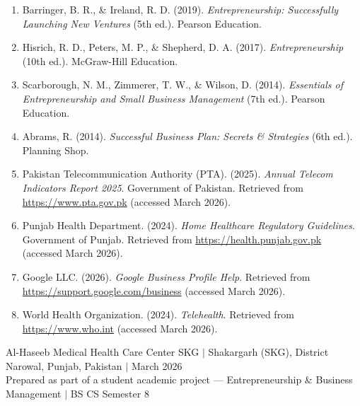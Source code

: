 \documentclass[12pt, a4paper]{article}
\begin{document}
\begin{enumerate}[leftmargin=1.6em]
    \item Barringer, B. R., \& Ireland, R. D. (2019). \textit{Entrepreneurship: Successfully Launching New Ventures} (5th ed.). Pearson Education.
    \item Hisrich, R. D., Peters, M. P., \& Shepherd, D. A. (2017). \textit{Entrepreneurship} (10th ed.). McGraw-Hill Education.
    \item Scarborough, N. M., Zimmerer, T. W., \& Wilson, D. (2014). \textit{Essentials of Entrepreneurship and Small Business Management} (7th ed.). Pearson Education.
    \item Abrams, R. (2014). \textit{Successful Business Plan: Secrets \& Strategies} (6th ed.). Planning Shop.
    \item Pakistan Telecommunication Authority (PTA). (2025). \textit{Annual Telecom Indicators Report 2025}. Government of Pakistan. Retrieved from \url{https://www.pta.gov.pk} (accessed March 2026).
    \item Punjab Health Department. (2024). \textit{Home Healthcare Regulatory Guidelines}. Government of Punjab. Retrieved from \url{https://health.punjab.gov.pk} (accessed March 2026).
    \item Google LLC. (2026). \textit{Google Business Profile Help}. Retrieved from \url{https://support.google.com/business} (accessed March 2026).
    \item World Health Organization. (2024). \textit{Telehealth}. Retrieved from \url{https://www.who.int} (accessed March 2026).
\end{enumerate}

\vfill
\begin{center}
\small
Al-Haseeb Medical Health Care Center SKG $\mid$ Shakargarh (SKG), District Narowal, Punjab, Pakistan $\mid$ March 2026\\
Prepared as part of a student academic project --- Entrepreneurship \& Business Management $\mid$ BS CS Semester 8
\end{center}
\end{document}
